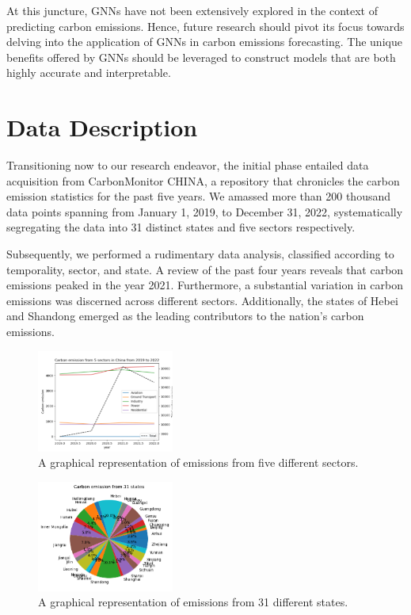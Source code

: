\documentclass[sigconf, authordraft]{acmart}
\begin{document}
At this juncture, GNNs have not been extensively explored in the context of predicting
carbon emissions. Hence, future research should pivot its focus towards delving
into the application of GNNs in carbon emissions forecasting. The unique
benefits offered by GNNs should be leveraged to construct models that are both
highly accurate and interpretable.

\section{Data Description}
Transitioning now to our research endeavor, the initial phase entailed data acquisition from CarbonMonitor CHINA, a repository that chronicles the carbon emission statistics for the past five years. We amassed more than 200 thousand data points spanning from January 1, 2019, to December 31, 2022, systematically segregating the data into 31 distinct states and five sectors respectively.

Subsequently, we performed a rudimentary data analysis, classified according to
temporality, sector, and state. A review of the past four years reveals that
carbon emissions peaked in the year 2021. Furthermore, a substantial variation
in carbon emissions was discerned across different sectors. Additionally, the states
of Hebei and Shandong emerged as the leading contributors to the nation's carbon
emissions.

\begin{figure}[ht]
	\centering
	\includegraphics[width=0.4\textwidth]{figures/emissions_from_5_sectors.png}
	\caption{A graphical representation of emissions from five different sectors.}
	\label{fig:emissions_from_5_sectors}
\end{figure}

\begin{figure}[ht]
	\centering
	\includegraphics[width=0.4\textwidth]{figures/emissions_from_31_states.png}
	\caption{A graphical representation of emissions from 31 different states.}
	\label{fig:emissions_from_31_states}
\end{figure}
\end{document}
